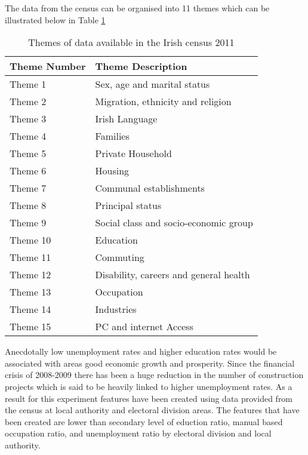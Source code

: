 The data from the census can be organised into 11 themes which can be illustrated below in Table \ref{table:censusThemes}

\begin{table}[H]
	\centering
	\small
	\begin{tabular}{|l|l|}
		\hline
		\textbf{Theme Number} & \textbf{Theme Description} \\ \hline
		Theme 1    & Sex, age and marital status \\ \hline
		Theme 2    & Migration, ethnicity and religion \\ \hline
		Theme 3    & Irish Language \\ \hline
		Theme 4    & Families \\ \hline
		Theme 5    & Private Household \\ \hline
		Theme 6    & Housing \\ \hline
		Theme 7	   & Communal establishments \\ \hline
		Theme 8    & Principal status \\ \hline
		Theme 9    & Social class and socio-economic group \\ \hline
		Theme 10   & Education \\ \hline
		Theme 11   & Commuting \\ \hline	
		Theme 12   & Disability, careers and general health \\ \hline		
		Theme 13   & Occupation \\ \hline
		Theme 14   & Industries \\ \hline
		Theme 15   & PC and internet Access \\ \hline			
	\end{tabular}
	\caption{Themes of data available in the Irish census 2011}
	\label{table:censusThemes}
\end{table}


Anecdotally low unemployment rates and higher education rates would be associated with areas good economic growth and prosperity. Since the financial crisis of 2008-2009 there has been a huge reduction in the number of construction projects which is said to be heavily linked to higher unemployment rates. As a result for this experiment features have been created using data provided from the census at local authority and electoral division areas. The features that have been created are lower than secondary level of eduction ratio, manual based occupation ratio, and unemployment ratio by electoral division and local authority.

